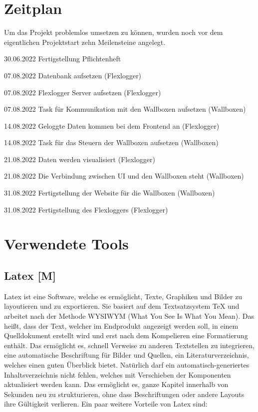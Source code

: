  
\section{Zeitplan}
 

Um das Projekt problemlos umsetzen zu können, wurden noch vor dem eigentlichen Projektstart zehn Meilensteine angelegt.   

\begin{compactitem}
  \item 30.06.2022 Fertigstellung Pflichtenheft  
  \item 07.08.2022 Datenbank aufsetzen (Flexlogger)  
  \item 07.08.2022 Flexlogger Server aufsetzen (Flexlogger)  
  \item 07.08.2022 Task für Kommunikation mit den Wallboxen aufsetzen (Wallboxen)  
  \item 14.08.2022 Geloggte Daten kommen bei dem Frontend an (Flexlogger)  
  \item 14.08.2022 Task für das Steuern der Wallboxen aufsetzen (Wallboxen)  
  \item 21.08.2022 Daten werden visualisiert (Flexlogger)  
  \item 21.08.2022 Die Verbindung zwischen UI und den Wallboxen steht (Wallboxen)  
  \item 31.08.2022 Fertigstellung der Website für die Wallboxen (Wallboxen)  
  \item 31.08.2022 Fertigstellung des Flexloggers (Flexlogger) 
\end{compactitem}
 
\section{Verwendete Tools}
 
 
 
\subsection{Latex [M]} 

Latex ist eine Software, welche es ermöglicht, Texte, Graphiken und Bilder zu layoutieren und zu exportieren. Sie basiert auf dem Textsatzsystem TeX und arbeitet nach der Methode WYSIWYM (What You See Is What You Mean). Das heißt, dass der Text, welcher im Endprodukt angezeigt werden soll, in einem Quelldokument erstellt wird und erst nach dem Kompelieren eine Formatierung enthält. Das ermöglicht es, schnell Verweise zu anderen Textstellen zu integrieren, eine automatische Beschriftung für Bilder und Quellen, ein Literaturverzeichnis, welches einen guten Überblick bietet. Natürlich darf ein automatisch-generiertes Inhaltsverzeichnis nicht fehlen, welches mit Verschieben der Komponenten aktualisiert werden kann. Das ermöglicht es, ganze Kapitel innerhalb von Sekunden neu zu strukturieren, ohne dass Beschriftungen oder andere Layouts ihre Gültigkeit verlieren. Ein paar weitere Vorteile von Latex sind:  

